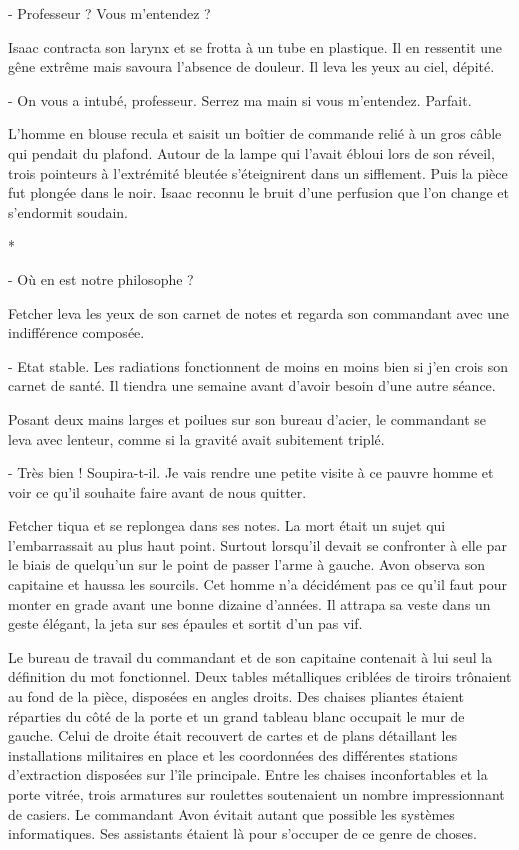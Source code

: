 \documentclass[12pt]{book}
\newcommand{\s}{\begin{center}
*
\end{center}
}
\begin{document}
- Professeur ? Vous m'entendez ?


Isaac contracta son larynx et se frotta à un tube en plastique. Il en ressentit une gêne extrême mais savoura l'absence de douleur. Il leva les yeux au ciel, dépité.


- On vous a intubé, professeur. Serrez ma main si vous m'entendez. Parfait.


L'homme en blouse recula et saisit un boîtier de commande relié à un gros câble qui pendait du plafond. Autour de la lampe qui l'avait ébloui lors de son réveil, trois pointeurs à l'extrémité bleutée s'éteignirent dans un sifflement. Puis la pièce fut plongée dans le noir. Isaac reconnu le bruit d'une perfusion que l'on change et s'endormit soudain.


\s

- Où en est notre philosophe ?

Fetcher leva les yeux de son carnet de notes et regarda son commandant avec une indifférence composée.

- Etat stable. Les radiations fonctionnent de moins en moins bien si j'en crois son carnet de santé. Il tiendra une semaine avant d'avoir besoin d'une autre séance.

Posant deux mains larges et poilues sur son bureau d'acier, le commandant se leva avec lenteur, comme si la gravité avait subitement triplé.

- Très bien ! Soupira-t-il. Je vais rendre une petite visite à ce pauvre homme et voir ce qu'il souhaite faire avant de nous quitter.

Fetcher tiqua et se replongea dans ses notes. La mort était un sujet qui l'embarrassait au plus haut point. Surtout lorsqu'il devait se confronter à elle par le biais de quelqu'un sur le point de passer l'arme à gauche. Avon observa son capitaine et haussa les sourcils. Cet homme n'a décidément pas ce qu'il faut pour monter en grade avant une bonne dizaine d'années. Il attrapa sa veste dans un geste élégant, la jeta sur ses épaules et sortit d'un pas vif.


Le bureau de travail du commandant et de son capitaine contenait à lui seul la définition du mot fonctionnel. Deux tables métalliques criblées de tiroirs trônaient au fond de la pièce, disposées en angles droits. Des chaises pliantes étaient réparties du côté de la porte et un grand tableau blanc occupait le mur de gauche. Celui de droite était recouvert de cartes et de plans détaillant les installations militaires en place et les coordonnées des différentes stations d'extraction disposées sur l'île principale. Entre les chaises inconfortables et la porte vitrée, trois armatures sur roulettes soutenaient un nombre impressionnant de casiers. Le commandant Avon évitait autant que possible les systèmes informatiques. Ses assistants étaient là pour s'occuper de ce genre de choses.
\end{document}
